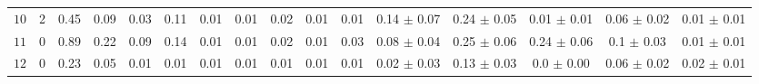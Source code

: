 \begin{tabular}{l|cc|cccccccc|ccccc}
 $10$  & 2 & 0.45 & 0.09 & 0.03 & 0.11 & 0.01 & 0.01 & 0.02 & 0.01 & 0.01 & 0.14 $\pm$ 0.07 & 0.24 $\pm$ 0.05 & 0.01 $\pm$ 0.01 & 0.06 $\pm$ 0.02 & 0.01 $\pm$ 0.01 \\ 
 $11$  & 0 & 0.89 & 0.22 & 0.09 & 0.14 & 0.01 & 0.01 & 0.02 & 0.01 & 0.03 & 0.08 $\pm$ 0.04 & 0.25 $\pm$ 0.06 & 0.24 $\pm$ 0.06 & 0.1 $\pm$ 0.03 & 0.01 $\pm$ 0.01 \\ 
 $12$  & 0 & 0.23 & 0.05 & 0.01 & 0.01 & 0.01 & 0.01 & 0.01 & 0.01 & 0.01 & 0.02 $\pm$ 0.03 & 0.13 $\pm$ 0.03 & 0.0 $\pm$ 0.00 & 0.06 $\pm$ 0.02 & 0.02 $\pm$ 0.01 \\ 
\end{tabular} 
